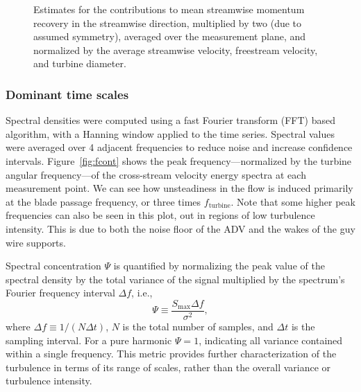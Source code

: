 \begin{figure}
    \centering
    
    
    \caption{Estimates for the contributions to mean streamwise momentum
        recovery in the streamwise direction, multiplied by two (due to assumed
        symmetry), averaged over the measurement plane, and normalized by the
        average streamwise velocity, freestream velocity, and turbine diameter.}
    
    \label{fig:mombargraph}
\end{figure}


\subsubsection{Dominant time scales}

Spectral densities were computed using a fast Fourier transform (FFT) based
algorithm, with a Hanning window applied to the time series. Spectral values
were averaged over 4 adjacent frequencies to reduce noise and increase
confidence intervals. Figure~\ref{fig:fcont} shows the peak
frequency---normalized by the turbine angular frequency---of the cross-stream
velocity energy spectra at each measurement point. We can see how unsteadiness
in the flow is induced primarily at the blade passage frequency, or three times
$f_\mathrm{turbine}$. Note that some higher peak frequencies can also be seen in
this plot, out in regions of low turbulence intensity. This is due to both the
noise floor of the ADV and the wakes of the guy wire supports.

Spectral concentration $\Psi$ is quantified by normalizing the peak value of the
spectral density by the total variance of the signal multiplied by the
spectrum's Fourier frequency interval $\Delta f$, i.e.,
\begin{equation}
    \Psi \equiv \frac{S_{\max} \Delta f}{\sigma^2},
    \label{eq-spec_cont}
\end{equation}
where $\Delta f \equiv 1/(N \Delta t)$, $N$ is the total number of samples, and
$\Delta t$ is the sampling interval. For a pure harmonic $\Psi = 1$, indicating
all variance contained within a single frequency. This metric provides further
characterization of the turbulence in terms of its range of scales, rather than
the overall variance or turbulence intensity.

